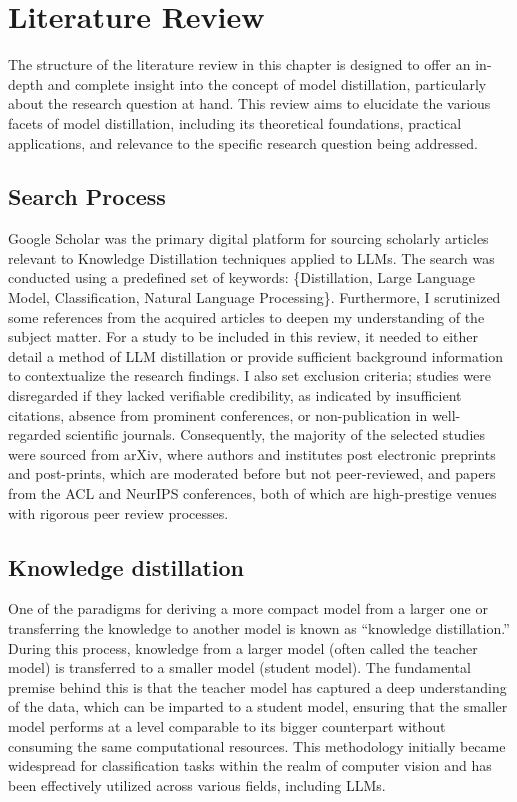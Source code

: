\chapter{Literature Review}
\label{chap:lr}

The structure of the literature review in this chapter is designed to offer an in-depth and complete insight into the concept of model distillation, particularly about the research question at hand. This review aims to elucidate the various facets of model distillation, including its theoretical foundations, practical applications, and relevance to the specific research question being addressed.

\section{Search Process}

Google Scholar was the primary digital platform for sourcing scholarly articles relevant to Knowledge Distillation techniques applied to LLMs. The search was conducted using a predefined set of keywords: \{Distillation, Large Language Model, Classification, Natural Language Processing\}. Furthermore, I scrutinized some references from the acquired articles to deepen my understanding of the subject matter. For a study to be included in this review, it needed to either detail a method of LLM distillation or provide sufficient background information to contextualize the research findings. I also set exclusion criteria; studies were disregarded if they lacked verifiable credibility, as indicated by insufficient citations, absence from prominent conferences, or non-publication in well-regarded scientific journals. Consequently, the majority of the selected studies were sourced from arXiv, where authors and institutes post electronic preprints and post-prints, which are moderated before but not peer-reviewed, and papers from the ACL and NeurIPS conferences, both of which are high-prestige venues with rigorous peer review processes.

\section{Knowledge distillation}

One of the paradigms for deriving a more compact model from a larger one or transferring the knowledge to another model is known as ``knowledge distillation.'' During this process, knowledge from a larger model (often called the teacher model) is transferred to a smaller model (student model). The fundamental premise behind this is that the teacher model has captured a deep understanding of the data, which can be imparted to a student model, ensuring that the smaller model performs at a level comparable to its bigger counterpart without consuming the same computational resources. This methodology initially became widespread for classification tasks within the realm of computer vision and has been effectively utilized across various fields, including LLMs.

